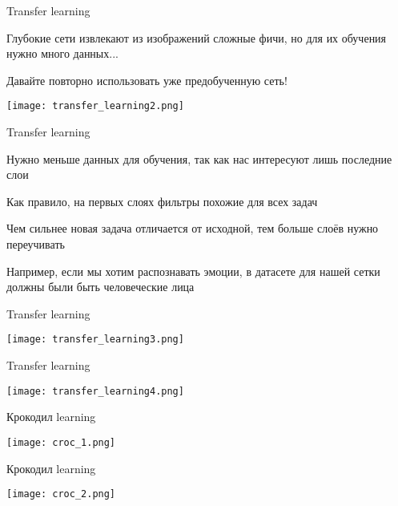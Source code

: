 \documentclass[notes,12pt, aspectratio=169]{beamer}
\newenvironment{wideitemize}{\itemize\addtolength{\itemsep}{10pt}}{\enditemize}
\begin{document}
\begin{frame}{Transfer learning}
\begin{wideitemize}
\item  Глубокие сети извлекают из изображений сложные фичи, но для их обучения нужно много данных...
\item  Давайте повторно использовать уже предобученную сеть!
\end{wideitemize}

\begin{center}
\texttt{[image: transfer\_learning2.png]}
\end{center}
\end{frame}


\begin{frame}{Transfer learning}
\begin{wideitemize}
	\item  Нужно меньше данных для обучения, так как нас интересуют лишь последние слои
	\item  Как правило, на первых слоях фильтры похожие для всех задач
	\item  Чем сильнее новая задача отличается от исходной, тем больше слоёв нужно переучивать
	\item  Например, если мы хотим распознавать эмоции, в датасете для нашей сетки должны были быть человеческие лица
\end{wideitemize}
\end{frame}


\begin{frame}{Transfer learning}
\begin{center}
\texttt{[image: transfer\_learning3.png]}
\end{center}
\end{frame}


\begin{frame}{Transfer learning}
\begin{center}
\texttt{[image: transfer\_learning4.png]}
\end{center}
\end{frame}


\begin{frame}{Крокодил learning}
\begin{center}
	\texttt{[image: croc\_1.png]}
\end{center}
\end{frame}

\begin{frame}{Крокодил learning}
\begin{center}
\texttt{[image: croc\_2.png]}
\end{center}
\end{frame}
\end{document}
